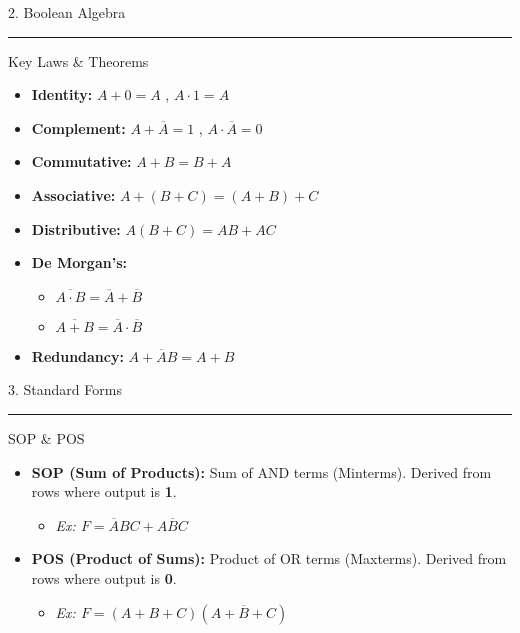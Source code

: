 \documentclass[a4paper, 8pt]{extarticle}
\newcommand{\sectionheading}[1]{%
  \par\vspace{0.7em}
  {\headingfont\fontsize{10.5pt}{11.5pt}\selectfont\color{black}#1}\par\nopagebreak
  \rule{\linewidth}{0.4pt}\vspace{0.2em}\nopagebreak
}
\newcommand{\subsectionheading}[1]{%
  \par\vspace{0.4em}\nopagebreak
  {\headingfont\fontsize{9pt}{10pt}\selectfont\color{black!80}#1}\par\nopagebreak\vspace{-0.3em}
}
\begin{document}
\begin{multicols}{3}
\sectionheading{2. Boolean Algebra}
\subsectionheading{Key Laws \& Theorems}
\begin{itemize}
    \item \textbf{Identity:} $A+0=A$ , $A \cdot 1=A$
    \item \textbf{Complement:} $A+\overline{A}=1$ , $A \cdot \overline{A}=0$
    \item \textbf{Commutative:} $A+B=B+A$
    \item \textbf{Associative:} $A+(B+C)=(A+B)+C$
    \item \textbf{Distributive:} $A(B+C)=AB+AC$
    \item \textbf{De Morgan's:}
    \begin{itemize}
        \item $\overline{A \cdot B} = \overline{A} + \overline{B}$
        \item $\overline{A+B} = \overline{A} \cdot \overline{B}$
    \end{itemize}
    \item \textbf{Redundancy:} $A+\overline{A}B=A+B$
\end{itemize}

\columnbreak


\sectionheading{3. Standard Forms}
\subsectionheading{SOP \& POS}
\begin{itemize}
    \item \textbf{SOP (Sum of Products):} Sum of AND terms (Minterms). Derived from rows where output is \textbf{1}.
    \begin{itemize}
        \item \textit{Ex: $F = \overline{A}BC + A\overline{B}C$}
    \end{itemize}
    \item \textbf{POS (Product of Sums):} Product of OR terms (Maxterms). Derived from rows where output is \textbf{0}.
     \begin{itemize}
        \item \textit{Ex: $F = (A+B+C)(A+\overline{B}+C)$}
    \end{itemize}
\end{itemize}


\end{multicols}
\end{document}
